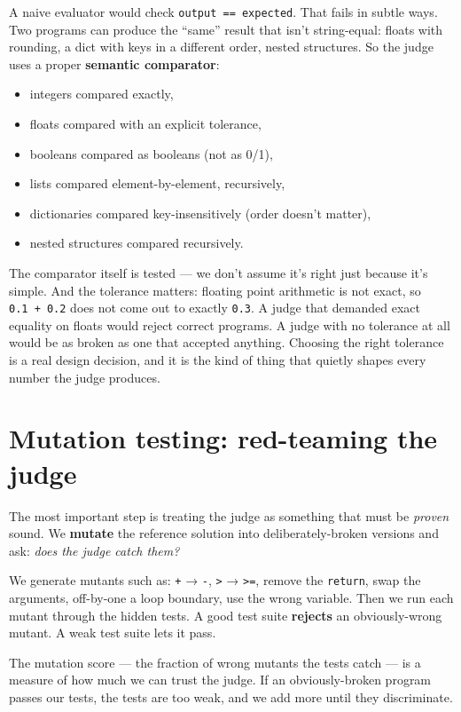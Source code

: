 A naive evaluator would check \texttt{output\ ==\ expected}. That fails
in subtle ways. Two programs can produce the ``same'' result that isn't
string-equal: floats with rounding, a dict with keys in a different
order, nested structures. So the judge uses a proper \textbf{semantic
comparator}:

\begin{itemize}
\tightlist
\item
  integers compared exactly,
\item
  floats compared with an explicit tolerance,
\item
  booleans compared as booleans (not as 0/1),
\item
  lists compared element-by-element, recursively,
\item
  dictionaries compared key-insensitively (order doesn't matter),
\item
  nested structures compared recursively.
\end{itemize}

The comparator itself is tested --- we don't assume it's right just
because it's simple. And the tolerance matters: floating point
arithmetic is not exact, so \texttt{0.1\ +\ 0.2} does not come out to
exactly \texttt{0.3}. A judge that demanded exact equality on floats
would reject correct programs. A judge with no tolerance at all would be
as broken as one that accepted anything. Choosing the right tolerance is
a real design decision, and it is the kind of thing that quietly shapes
every number the judge produces.

\section{Mutation testing: red-teaming the
judge}\label{mutation-testing-red-teaming-the-judge}

The most important step is treating the judge as something that must be
\emph{proven} sound. We \textbf{mutate} the reference solution into
deliberately-broken versions and ask: \emph{does the judge catch them?}

We generate mutants such as: \texttt{+} → \texttt{-},
\texttt{\textgreater{}} → \texttt{\textgreater{}=}, remove the
\texttt{return}, swap the arguments, off-by-one a loop boundary, use the
wrong variable. Then we run each mutant through the hidden tests. A good
test suite \textbf{rejects} an obviously-wrong mutant. A weak test suite
lets it pass.

The mutation score --- the fraction of wrong mutants the tests catch ---
is a measure of how much we can trust the judge. If an obviously-broken
program passes our tests, the tests are too weak, and we add more until
they discriminate.

